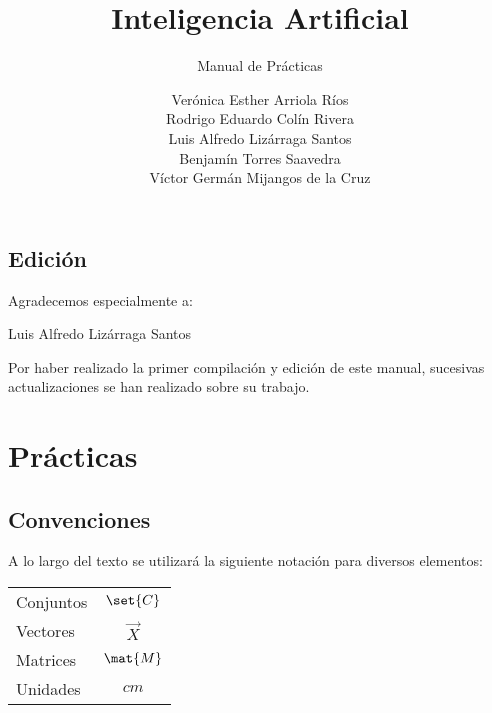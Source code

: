 \documentclass[12pt,openany]{book}
\title{Inteligencia Artificial}
\subtitle{Manual de Prácticas}
\author{
  Verónica Esther Arriola Ríos \\
  Rodrigo Eduardo Colín Rivera \\
  Luis Alfredo Lizárraga Santos \\
  Benjamín Torres Saavedra \\
  Víctor Germán Mijangos de la Cruz \\
}
\begin{document}
\maketitle

\chapter*{Edición}


Agradecemos especialmente a:

\begin{center}
 Luis Alfredo Lizárraga Santos
\end{center}
 
Por haber realizado la primer compilación y edición de este manual, sucesivas actualizaciones se han realizado sobre su trabajo.



\frontmatter %
\tableofcontents
\clearemptydoublepage %

\listofauxcodes


\mainmatter  %



\part{Prácticas}


\chapter*{Convenciones}

A lo largo del texto se utilizará la siguiente notación para diversos elementos:
\begin{longtable}{lc}
 Conjuntos   &   $\set{C}$ \\
 Vectores    &   $\vec{X}$ \\
 Matrices    &   $\mat{M}$ \\
 Unidades    &   $\unit{cm}$
\end{longtable}
\end{document}

